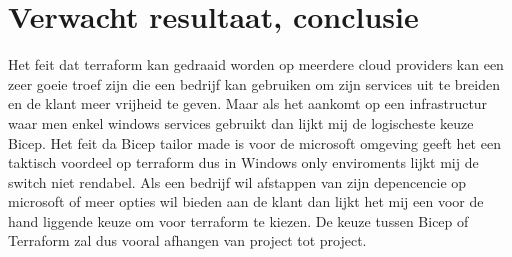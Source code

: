 \section{Verwacht resultaat, conclusie}%
\label{sec:verwachte_resultaten}

Het feit dat terraform kan gedraaid worden op meerdere cloud providers kan een zeer goeie troef zijn die een bedrijf kan gebruiken om zijn services uit te breiden en de klant meer vrijheid te geven.
Maar als het aankomt op een infrastructur waar men enkel windows services gebruikt dan lijkt mij de logischeste keuze Bicep.
Het feit da Bicep tailor made is voor de microsoft omgeving geeft het een taktisch voordeel op terraform dus in Windows only enviroments lijkt mij de switch niet rendabel.
Als een bedrijf wil afstappen van zijn depencencie op microsoft of meer opties wil bieden aan de klant dan lijkt het mij een voor de hand liggende keuze om voor terraform te kiezen.
De keuze tussen Bicep of Terraform zal dus vooral afhangen van project tot project.

